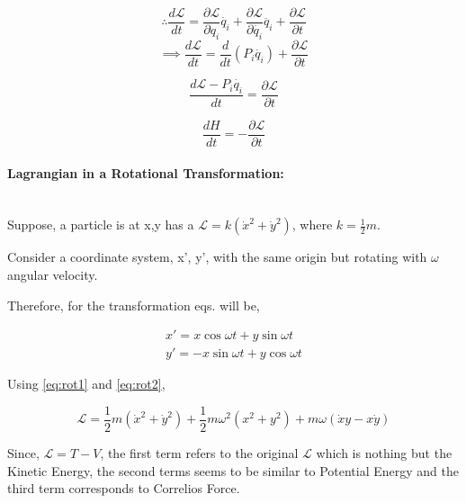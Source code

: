 \documentclass[a4paper]{article}
\newcommand{\Lagr}{\mathcal{L}}
\newcommand{\ddt}{\frac{d}{dt}}
\newcommand{\ddtf}[1]{\frac{d #1}{dt}}
\newcommand{\pdt}[2]{\frac{\partial #1}{\partial #2}}
\newcommand{\half}{\frac{1}{2}}
\begin{document}




				$$ \therefore \ddtf{\Lagr} = \pdt{\Lagr}{q_i}\dot{q_i} + \pdt{\Lagr}{\dot{q_i}}\ddot{q_i} + \pdt{\Lagr}{t} $$
				$$ \implies \ddtf{\Lagr} = \ddt(P_i \dot{q_i}) + \pdt{\Lagr}{t} $$

				$$ \ddtf{\Lagr - P_i \dot{q_i}} = \pdt{\Lagr}{t} $$

				\begin{equation}
					\ddtf{H} = - \pdt{\Lagr}{t}
				\end{equation}


	\paragraph*{Lagrangian in a Rotational Transformation: }\noindent\hfill\\
		 
		Suppose, a particle is at x,y has a $\Lagr = k (\dot{x}^2 + \dot{y}^2)$, where $ k = \half m $.

		Consider a coordinate system, {x', y'}, with the same origin but rotating with $\omega$ angular velocity.

		Therefore, for the transformation eqs. will be,

		\begin{eqnarray}
			x' = x\cos{\omega t} + y\sin{\omega t}\label{eq:rot1} \\
			y' = -x\sin{\omega t} + y\cos{\omega t}\label{eq:rot2}
		\end{eqnarray}
		

		Using \eqref{eq:rot1} and \eqref{eq:rot2},

		\begin{equation}
			\Lagr = \half m (\dot{x}^2 + \dot{y}^2) + \half m \omega^2(x^2 + y^2) + m \omega (\dot{x}y - x\dot{y})
		\end{equation}

		Since, $ \Lagr = T - V $, the first term refers to the original $\Lagr$ which is nothing but the Kinetic Energy, the second terms seems to be similar to Potential Energy and the third term corresponds to Correlios Force.
\end{document}
